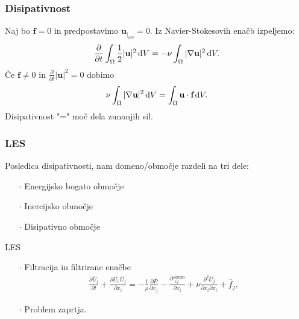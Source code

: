 \documentclass{beamer}
\newcommand{\bd}{\textbf}
\begin{document}
\begin{frame}
\frametitle{Disipativnost}
Naj bo $\bd{f} = 0$ in predpostavimo $\bd{u}_{|_{\partial\Omega}} = 0$. 
\pause
Iz Navier-Stokesovih enačb izpeljemo:
\[
\frac{\partial}{\partial t}\int_\Omega \frac{1}{2} |\bd{u}|^2 \dif V = - \nu\int_\Omega |\nabla \bd{u}|^2 \dif V.
\]
\pause
Če $\bd{f} \neq 0$ in $\frac{\partial}{\partial t} |\bd{u}|^2 = 0$
dobimo 
\pause
\[
 \nu\int_\Omega |\nabla \bd{u}|^2 \dif V = \int_\Omega \bd{u}\cdot \bd{f} \dif V.
\]
Disipativnost "=" moč dela zunanjih sil.
\end{frame}


\begin{frame}
\frametitle{LES}
\pause
Posledica disipativnosti, nam domeno/območje razdeli na 
tri dele:
\begin{itemize}
\item[\Large$\cdot$] Energijsko bogato območje
\item[\Large$\cdot$] Inercijsko območje 
\item[\Large$\cdot$] Disipativno območje
\end{itemize}
\pause
LES
\begin{itemize}
    \item[\Large$\cdot$] Filtracija in filtrirane enačbe
    \pause
    \begin{align*} 
        \frac{\partial \overline{U}_j}{\partial t} + \frac{\partial \overline{U_i}\, \overline{U_j}}{\partial x_i} = -\frac{1}{\rho} \frac{\partial \overline{P}}{\partial x_j} 
- \frac{\partial \tau_{ij}^\text{anizo}}{\partial x_i}+ \nu \frac{\partial^2 \overline{U}_j}{\partial x_i \partial x_i} + \overline{f}_j,
    \end{align*}
    \pause
    \item[\Large$\cdot$] Problem zaprtja.
\end{itemize}
\end{frame}
\end{document}
